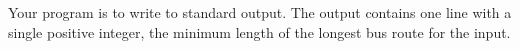 Your program is to write to standard output. The output contains one line with a single
positive integer, the minimum length of the longest bus route for the input.